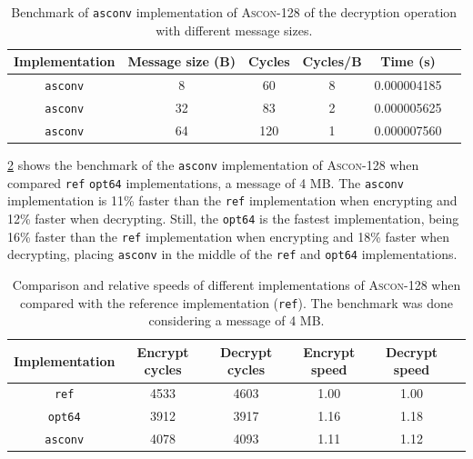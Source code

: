 \documentclass[11pt,twoside]{article}
\begin{document}
\begin{table}[h]
  \centering
  \begin{tabular}{|c|c|c|c|c|c|}
    \hline
    \textbf{Implementation} & \textbf{Message size (B)} &
    \textbf{Cycles}         & \textbf{Cycles/B}         & \textbf{Time (s)}                   \\ \hline

    \texttt{asconv}         & 8                         & 60                & 8 & 0.000004185 \\ \hline

    \texttt{asconv}         & 32                        & 83                & 2 & 0.000005625 \\ \hline

    \texttt{asconv}         & 64                        & 120               & 1 & 0.000007560 \\ \hline
  \end{tabular}
  \caption{Benchmark of \texttt{asconv} implementation of \textsc{Ascon-128} of the decryption operation with different message sizes.}
  \label{table:asconvDecryptionBenchmark}
\end{table}

\cref{table:relativeBenchmark} shows the benchmark of the \texttt{asconv} implementation of \textsc{Ascon-128} when compared \texttt{ref} \texttt{opt64} implementations, a message of 4 MB. The \texttt{asconv} implementation is 11\% faster than the \texttt{ref} implementation when encrypting and 12\% faster when decrypting. Still, the \texttt{opt64} is the fastest implementation, being 16\% faster than the \texttt{ref} implementation when encrypting and 18\% faster when decrypting, placing \texttt{asconv} in the middle of the \texttt{ref} and \texttt{opt64} implementations.

\begin{table}[h]
  \centering
  \begin{tabular}{|c|c|c|c|c|c|}
    \hline
    \textbf{Implementation} & \textbf{Encrypt cycles} &
    \textbf{Decrypt cycles} & \textbf{Encrypt speed}  & \textbf{Decrypt speed}               \\ \hline

    \texttt{ref}            & 4533                    & 4603                   & 1.00 & 1.00 \\ \hline

    \texttt{opt64}          & 3912                    & 3917                   & 1.16 & 1.18 \\ \hline

    \texttt{asconv}         & 4078                    & 4093                   & 1.11 & 1.12 \\ \hline
  \end{tabular}
  \caption{Comparison and relative speeds of different implementations of \textsc{Ascon-128} when compared with the reference implementation (\texttt{ref}). The benchmark was done considering a message of 4 MB.}
  \label{table:relativeBenchmark}
\end{table}
\end{document}
